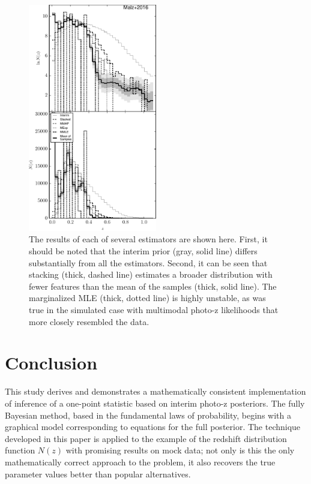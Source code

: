 \documentclass[preprint]{aastex}
\begin{document}
\begin{figure}
\includegraphics[width=0.5\textwidth]{figs/bias/comps.pdf}
\caption{The results of each of several estimators are shown here.  First, it 
should be noted that the interim prior (gray, solid line) differs substantially 
from all the estimators.  Second, it can be seen that stacking (thick, dashed 
line) estimates a broader distribution with fewer features than the mean of the 
samples (thick, solid line).  The marginalized MLE (thick, dotted line) is 
highly unstable, as was true in the simulated case with multimodal photo-z 
likelihoods that more closely resembled the data.}
\label{fig:biascomp}
\end{figure}

\clearpage
\section{Conclusion}
\label{sec:con}

This study derives and demonstrates a mathematically consistent implementation 
of inference of a one-point statistic based on interim photo-z posteriors.  The 
fully Bayesian method, based in the fundamental laws of probability, begins 
with a graphical model corresponding to equations for the full posterior.  The 
technique developed in this paper is applied to the example of the redshift 
distribution function $N(z)$ with promising results on mock data; not only is 
this the only mathematically correct approach to the problem, it also recovers 
the true parameter values better than popular alternatives.  
\end{document}
